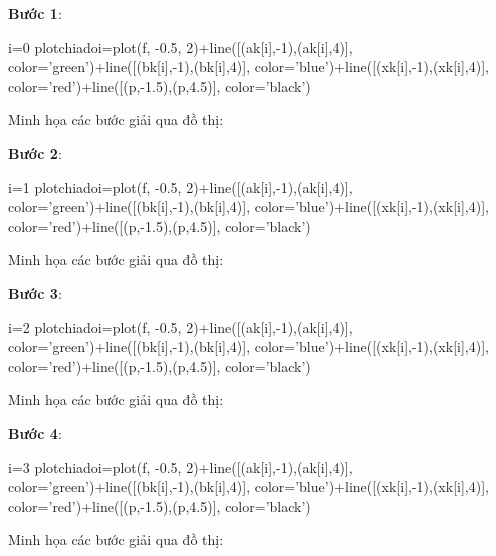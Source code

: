 \documentclass[12pt]{article}
\begin{document}
\textbf{Bước 1}:

\begin{sagesilent}
 i=0
 plotchiadoi=plot(f, -0.5, 2)+line([(ak[i],-1),(ak[i],4)], color='green')+line([(bk[i],-1),(bk[i],4)], color='blue')+line([(xk[i],-1),(xk[i],4)], color='red')+line([(p,-1.5),(p,4.5)], color='black')
\end{sagesilent}


\newpage{}

Minh họa các bước giải qua đồ thị:

\textbf{Bước 2}:

\begin{sagesilent}
 i=1
 plotchiadoi=plot(f, -0.5, 2)+line([(ak[i],-1),(ak[i],4)], color='green')+line([(bk[i],-1),(bk[i],4)], color='blue')+line([(xk[i],-1),(xk[i],4)], color='red')+line([(p,-1.5),(p,4.5)], color='black')
\end{sagesilent}


\newpage{}

Minh họa các bước giải qua đồ thị:

\textbf{Bước 3}:

\begin{sagesilent}
 i=2
 plotchiadoi=plot(f, -0.5, 2)+line([(ak[i],-1),(ak[i],4)], color='green')+line([(bk[i],-1),(bk[i],4)], color='blue')+line([(xk[i],-1),(xk[i],4)], color='red')+line([(p,-1.5),(p,4.5)], color='black')
\end{sagesilent}


\newpage{}

Minh họa các bước giải qua đồ thị:

\textbf{Bước 4}:

\begin{sagesilent}
 i=3
 plotchiadoi=plot(f, -0.5, 2)+line([(ak[i],-1),(ak[i],4)], color='green')+line([(bk[i],-1),(bk[i],4)], color='blue')+line([(xk[i],-1),(xk[i],4)], color='red')+line([(p,-1.5),(p,4.5)], color='black')
\end{sagesilent}


\newpage{}

Minh họa các bước giải qua đồ thị:
\end{document}
